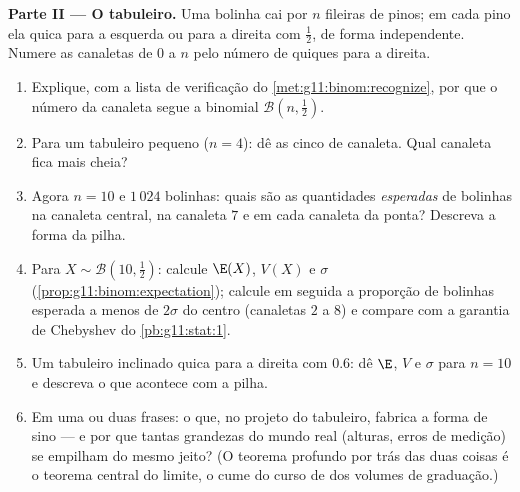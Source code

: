 \begin{problem}
\medskip
\noindent\textbf{Parte II --- O tabuleiro.}
Uma bolinha cai por $n$ fileiras de pinos; em cada pino ela quica
para a esquerda ou para a direita com  $\frac12$, de
forma independente. Numere as canaletas de $0$ a $n$ pelo número
de quiques para a direita.
\begin{enumerate}[resume]
  \item Explique, com a lista de verificação do
        \cref{met:g11:binom:recognize}, por que o número da
        canaleta segue a  binomial
        $\mathcal B\!\left(n, \frac12\right)$.
  \item Para um tabuleiro pequeno ($n = 4$): dê as cinco
         de canaleta. Qual canaleta fica mais
        cheia?
  \item Agora $n = 10$ e $1\,024$ bolinhas: quais são as
        quantidades \emph{esperadas} de bolinhas na canaleta
        central, na canaleta $7$ e em cada canaleta da ponta?
        Descreva a forma da pilha.
  \item Para $X \sim \mathcal B\!\left(10, \frac12\right)$:
        calcule $\E(X)$, $V(X)$ e $\sigma$
        (\cref{prop:g11:binom:expectation}); calcule em seguida
        a proporção de bolinhas esperada a menos de $2\sigma$ do
        centro (canaletas $2$ a $8$) e compare com a garantia de
        Chebyshev do \cref{pb:g11:stat:1}.
  \item Um tabuleiro inclinado quica para a direita com
         $0.6$: dê $\E$, $V$ e $\sigma$ para
        $n = 10$ e descreva o que acontece com a pilha.
  \item Em uma ou duas frases: o que, no projeto do tabuleiro,
        fabrica a forma de sino --- e por que tantas grandezas do
        mundo real (alturas, erros de medição) se empilham do
        mesmo jeito? (O teorema profundo por trás das duas coisas
        é o teorema central do limite, o cume do curso de
         dos volumes de graduação.)
\end{enumerate}


\end{problem}
